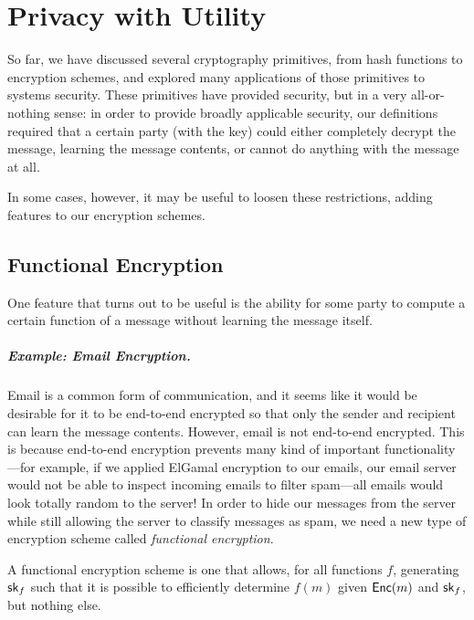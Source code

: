 \chapter{Privacy with Utility}

So far, we have discussed several cryptography primitives, from hash functions to encryption schemes, and explored many applications of those primitives to systems security. These primitives have provided security, but in a very all-or-nothing sense: in order to provide broadly applicable security, our definitions required that a certain party (with the key) could either completely decrypt the message, learning the message contents, or cannot do anything with the message at all. 

In some cases, however, it may be useful to loosen these restrictions, adding features to our encryption schemes.

\section{Functional Encryption}
One feature that turns out to be useful is the ability for some party to compute a certain function of a message without learning the message itself.

\paragraph{Example: Email Encryption.} Email is a common form of communication, and it seems like it would be desirable for it to be end-to-end encrypted so that only the sender and recipient can learn the message contents. However, email is not end-to-end encrypted. This is because end-to-end encryption prevents many kind of important functionality---for example, if we applied ElGamal encryption to our emails, our email server would not be able to inspect incoming emails to filter spam---all emails would look totally random to the server! In order to hide our messages from the server while still allowing the server to classify messages as spam, we need a new type of encryption scheme called \emph{functional encryption}.

\begin{definition}
A functional encryption scheme is one that allows, for all functions $f$, generating ${\mathsf{sk}}_f$ such that it is possible to efficiently determine $f(m)$ given $\mathsf{Enc}(m)$ and ${\mathsf{sk}}_f$, but nothing else.
\end{definition}

